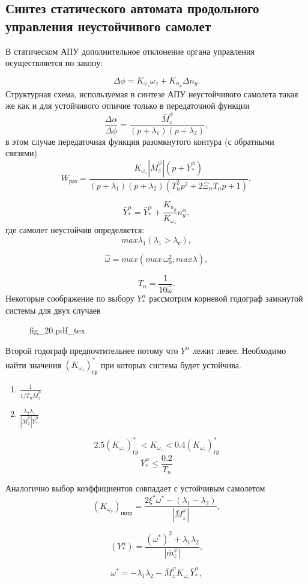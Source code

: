 \documentclass{article}
\begin{document}
\subsection{Синтез статического автомата продольного управления неустойчивого
	самолет}
В статическом АПУ дополнительное отклонение органа управления осуществляется по
закону:

\[
	\Delta \phi = K_{\omega_{z}} \omega_z + K_{n_y} \Delta n_y.
\]
Структурная схема, используемая в синтезе АПУ неустойчивого самолета такая же
как и для устойчивого отличие только в передаточной функции
\[
	{\frac{\Delta \alpha}{\Delta \phi} } =
	\frac{\bar{M}_z^\phi}{(p+\lambda_1)(p+\lambda_2)},
\]
в этом случае передаточная функция разомкнутого контура (с обратными связями)
\[
	W_\text{раз} = \frac{K_{\omega_z} |\bar{M}_z^\phi |(p + \bar{Y}^\alpha_*)
	}{(p+\lambda_1)(p+\lambda_2)(T_n^2 p^2 + 2 \Xi_n T_n p +1)},
\]

\[
	\bar{Y}_*^\alpha = \bar{Y}_*^\alpha + \frac{K_{n_y}}{K_{\omega_z}}
	n_y^\alpha,
\]
где самолет неустойчив определяется:
\[
	max \lambda_1 (\lambda_1 > \lambda_\text{с}),
\]

\[
	\hat{\omega} = max(max \, \omega_0^2, max \lambda),
\]

\[
	T_n = \frac{1}{10 \hat{\omega}}.
\]
Некоторые соображение по выбору $Y_*^\alpha$ рассмотрим корневой годограф
замкнутой системы для двух случаев
\begin{figure}[ht]
	\centering
	{fig_20.pdf_tex}
\end{figure}

Второй годограф предпочтительнее потому что $Y^\alpha$ лежит левее.
Необходимо найти значения $(K_{\omega_z})_\text{гр}^*$ при которых система
будет устойчива.
\begin{enumerate}
	\item $\frac{1}{1/T_n \bar{M}_z^\phi}$
	\item $\frac{\lambda_2 \lambda_1}{| \bar{M}_z^\phi|\bar{Y}_*^\alpha}$
\end{enumerate}
\[
	2.5 (K_{\omega_z})^*_\text{гр} < K_{\omega_z} <
	0.4(K_{\omega_z})^*_\text{гр}
\]
\[
	\bar{Y}_*^\alpha \le \frac{0.2}{T_n}
\]

Аналогично выбор коэффициентов совпадает с устойчивым самолетом
\[
	(K_{\omega_z})_\text{потр} = \frac{2 \xi^* \omega^* - (\lambda_1 -
		\lambda_2)}{|\bar{M}_z^\varphi|},
\]

\[
	(Y_*^\alpha) = \frac{(\omega^*)^2 + \lambda_1
		\lambda_2}{|\bar{m}_z^\varphi|},
\]

\[
	\omega^* =  - \lambda_1 \lambda_2 - \bar{M}_z^\varphi K_{\omega_z}
	\bar{Y}_*^\alpha,
\]
\end{document}

